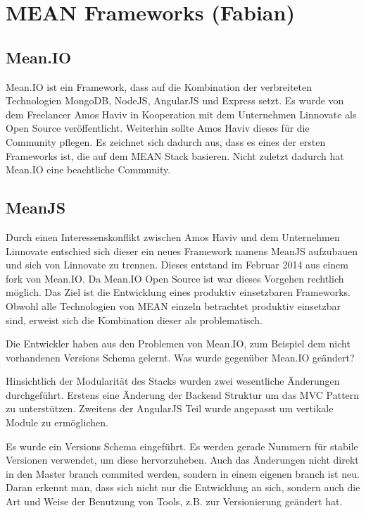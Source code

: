 \chapter{MEAN Frameworks (Fabian)}\label{mean-frameworks-fabian}

\section{Mean.IO}\label{mean.io}

Mean.IO ist ein Framework, dass auf die Kombination der verbreiteten
Technologien MongoDB, NodeJS, AngularJS und Express setzt. Es wurde
von dem Freelancer Amos Haviv in Kooperation mit dem Unternehmen
Linnovate als Open Source veröffentlicht. Weiterhin sollte Amos Haviv
dieses für die Community pflegen. Es zeichnet sich dadurch aus, dass es
eines der ersten Frameworks ist, die auf dem MEAN Stack basieren. Nicht
zuletzt dadurch hat Mean.IO eine beachtliche Community.

\section{MeanJS}\label{mean.js}

Durch einen Interessenskonflikt zwischen Amos Haviv und dem Unternehmen
Linnovate entschied sich dieser ein neues Framework namens MeanJS
aufzubauen und sich von Linnovate zu trennen. Dieses entstand im Februar
2014 aus einem fork von Mean.IO. Da Mean.IO Open Source ist war dieses
Vorgehen rechtlich möglich. Das Ziel ist die Entwicklung eines produktiv
einsetzbaren Frameworks. Obwohl alle Technologien von MEAN einzeln
betrachtet produktiv einsetzbar sind, erweist sich die Kombination
dieser als problematisch.

Die Entwickler haben aus den Problemen von Mean.IO, zum Beispiel dem
nicht vorhandenen Versions Schema gelernt. Was wurde gegenüber Mean.IO
geändert?

Hinsichtlich der Modularität des Stacks wurden zwei wesentliche Änderungen durchgeführt. Erstens eine Änderung der Backend Struktur um das MVC Pattern zu unterstützen. Zweitens der AngularJS Teil wurde angepasst um vertikale Module zu ermöglichen.

Es wurde ein Versions Schema eingeführt. Es werden gerade Nummern für stabile Versionen verwendet, um diese hervorzuheben. Auch das Änderungen nicht direkt in den Master branch commited werden, sondern in einem eigenen branch ist neu. Daran erkennt man, dass sich nicht nur die Entwicklung an sich, sondern auch die Art und Weise der Benutzung von Tools, z.B. zur Versionierung geändert hat.


